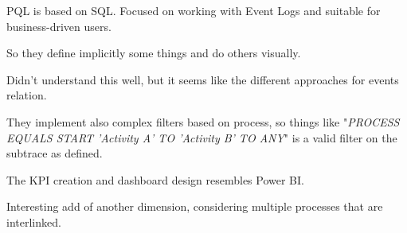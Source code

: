 \nextslides[until=23] 

PQL is based on SQL. Focused on working with Event Logs and suitable for business-driven users.

\nextslides

So they define implicitly some things and do others visually.

\nextslides

Didn't understand this well, but it seems like the different approaches for events relation.

\nextslides[slide=27] 

They implement also complex filters based on process, so things like "\emph{PROCESS EQUALS START 'Activity A' TO 'Activity B' TO ANY}" is a valid filter on the subtrace as defined.

The KPI creation and dashboard design resembles Power BI.

\nextslides[slide=34] 

Interesting add of another dimension, considering multiple processes that are interlinked.

